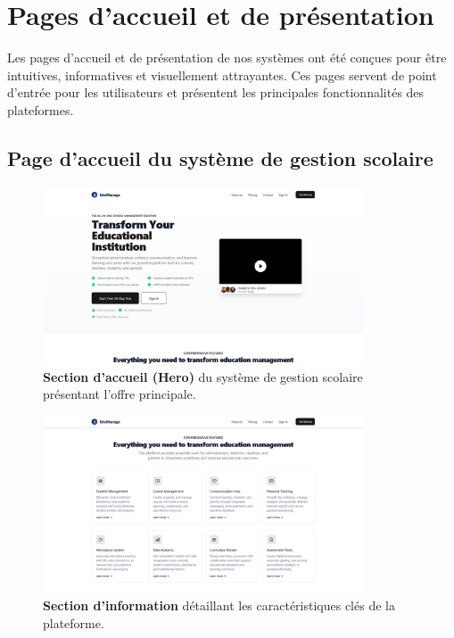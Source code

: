 \section{Pages d'accueil et de présentation}

Les pages d'accueil et de présentation de nos systèmes ont été conçues pour être intuitives, informatives et visuellement attrayantes. Ces pages servent de point d'entrée pour les utilisateurs et présentent les principales fonctionnalités des plateformes.

\subsection{Page d'accueil du système de gestion scolaire}

\begin{figure}[H]
  \centering
  \includegraphics[width=0.85\textwidth,keepaspectratio]{pfe-pics/landing/hero.png}
  \caption{\textbf{Section d'accueil (Hero)} du système de gestion scolaire présentant l'offre principale.}
  \label{fig:landing_hero}
\end{figure}

\begin{figure}[H]
  \centering
  \includegraphics[width=0.85\textwidth,keepaspectratio]{pfe-pics/landing/info.png}
  \caption{\textbf{Section d'information} détaillant les caractéristiques clés de la plateforme.}
  \label{fig:landing_info}
\end{figure}


